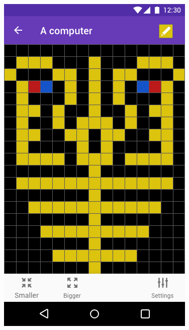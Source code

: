 \documentclass{report}
\begin{document}
\begin{minipage}{.45\textwidth}
  \begin{minipage}{.45\linewidth}
    \includegraphics[width=\linewidth]{../mock-ups/Edit_game.png}
  \end{minipage}\hfill
  \begin{minipage}{.45\linewidth}
  \end{minipage}%
\end{minipage} \hfill
\end{document}
